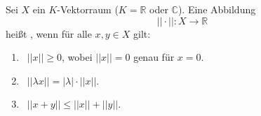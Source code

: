 Sei $X$ ein $K$-Vektorraum ($K = \mathbb{R}$ oder $\mathbb{C}$). Eine Abbildung
$$||\cdot||: X \to \mathbb{R}$$
heißt , wenn für alle $x, y \in X$ gilt:
\begin{enumerate}[label="",leftmargin=0pt]
    \item {} \, $||x|| \geq 0$, wobei $||x|| = 0$ genau für $x = 0$.
    \item {} \, $||\lambda x|| = |\lambda| \cdot ||x||$.
    \item {} \, $||x+y|| \leq ||x|| + ||y||$.
\end{enumerate}